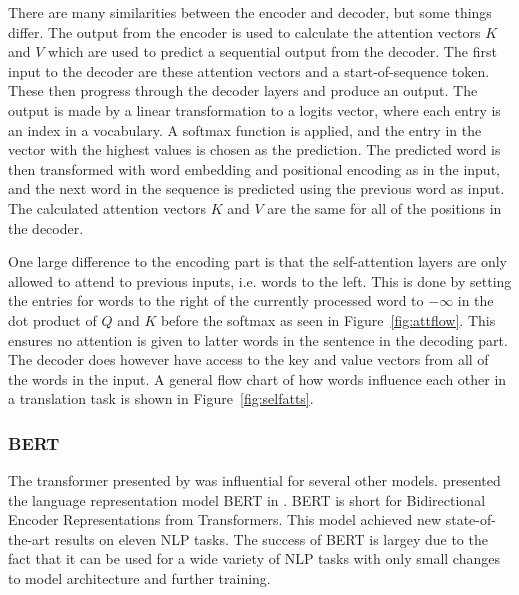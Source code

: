 There are many similarities between the encoder and decoder, but some things differ. The output from the encoder is used to calculate the attention vectors $K$ and $V$ which are used to predict a sequential output from the decoder. The first input to the decoder are these attention vectors and a start-of-sequence token. These then progress through the decoder layers and produce an output. The output is made by a linear transformation to a logits vector, where each entry is an index in a vocabulary. A softmax function is applied, and the entry in the vector with the highest values is chosen as the prediction. The predicted word is then transformed with word embedding and positional encoding as in the input, and the next word in the sequence is predicted using the previous word as input. The calculated attention vectors $K$ and $V$ are the same for all of the positions in the decoder. 

One large difference to the encoding part is that the self-attention layers are only allowed to attend to previous inputs, i.e. words to the left. This is done by setting the entries for words to the right of the currently processed word to $-\infty$ in the dot product of $Q$ and $K$ before the softmax as seen in Figure~\ref{fig:attflow}. This ensures no attention is given to latter words in the sentence in the decoding part. The decoder does however have access to the key and value vectors from all of the words in the input. A general flow chart of how words influence each other in a translation task is shown in Figure~\ref{fig:selfatts}.

\subsubsection{BERT}\label{sec:bert_theory}

The transformer presented by \citeauthor{NIPS2017_7181} was influential for several other models. \citeauthor{devlin2018bert} presented the language representation model BERT in \citeyear{devlin2018bert}. BERT is short for Bidirectional Encoder Representations from Transformers. This model achieved new state-of-the-art results on eleven NLP tasks. The success of BERT is largey due to the fact that it can be used for a wide variety of NLP tasks with only small changes to model architecture and further training.

